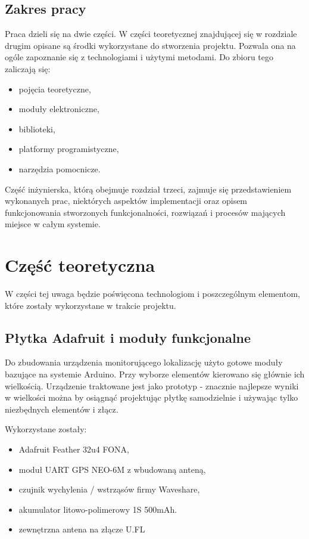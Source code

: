\documentclass[eng,printmode]{mgr}
\begin{document}
\section{Zakres pracy}
Praca dzieli się na dwie części. W części teoretycznej znajdującej się w rozdziale drugim opisane są środki wykorzystane do stworzenia projektu. Pozwala ona na ogóle zapoznanie się z technologiami i użytymi metodami. Do zbioru tego zaliczają się:
\begin{itemize}
\item pojęcia teoretyczne,
\item moduły elektroniczne,
\item biblioteki,
\item platformy programistyczne,
\item narzędzia pomocnicze.
\end{itemize}

Część inżynierska, którą obejmuje rozdział trzeci, zajmuje się przedstawieniem wykonanych prac, niektórych aspektów implementacji oraz opisem funkcjonowania stworzonych funkcjonalności, rozwiązań i procesów mających miejsce w całym systemie.

\chapter{Część teoretyczna}
W części tej uwaga będzie poświęcona technologiom i poszczególnym elementom, które zostały wykorzystane w trakcie projektu. 

\section{Płytka Adafruit i moduły funkcjonalne}
Do zbudowania urządzenia monitorującego lokalizację użyto gotowe moduły bazujące na systemie Arduino. Przy wyborze elementów kierowano się głównie ich wielkością. Urządzenie traktowane jest jako prototyp - znacznie najlepsze wyniki w wielkości można by osiągnąć projektując płytkę samodzielnie i używając tylko niezbędnych elementów i złącz.

Wykorzystane zostały:
\begin{itemize}
\item Adafruit Feather 32u4 FONA,
\item moduł UART GPS NEO-6M z wbudowaną anteną,
\item czujnik wychylenia / wstrząsów firmy Waveshare,
\item akumulator litowo-polimerowy 1S 500mAh.
\item zewnętrzna antena na złącze U.FL
\end{itemize}
\end{document}
